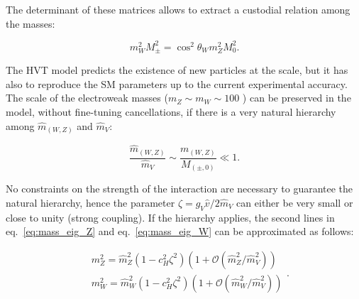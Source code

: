 \noindent The determinant of these matrices allows to extract a custodial relation among the masses:

\begin{equation}
m_W^2 M_{\pm}^2 = \cos^2{{\theta}_W} m_Z^2 M_0^2.
\label{eq:custodial_relation}
\end{equation}
%

\noindent The HVT model predicts the existence of new particles at the \TeV scale, but it has also to reproduce the SM parameters up to the current experimental accuracy. The scale of the electroweak masses ($m_Z \sim m_W \sim 100$ \GeV) can be preserved in the model, without fine-tuning cancellations, if there is a very natural hierarchy among $\hat{m}_{(W,Z)}$ and $\hat{m}_V$:

\begin{equation}
\frac{\hat{m}_{(W,Z)}}{\hat{m}_V} \sim \frac{{m}_{(W,Z)}}{M_{(\pm, 0)}} \ll 1.
\label{eq:mass_hierarchy}
\end{equation}

%
\noindent No constraints on the strength of the interaction are necessary to guarantee the natural hierarchy, hence the parameter $\zeta = g_V \hat{v} / 2 \hat{m}_V$ can either be very small or close to unity (strong coupling). If the hierarchy applies, the second lines in eq.~\ref{eq:mass_eig_Z} and eq.~\ref{eq:mass_eig_W} can be approximated as follows:

\begin{equation}
\begin{split}
& m_Z^2 = \hat{m}_Z^2 \left( 1 - c_H^2 {\zeta}^2\right) \left( 1 + \mathcal{O}(\hat{m}_Z^2/\hat{m}_V^2) \right) \\
& m_W^2 = \hat{m}_W^2 \left( 1 - c_H^2 {\zeta}^2\right) \left( 1 + \mathcal{O}(\hat{m}_W^2/\hat{m}_V^2) \right) \\
\end{split}
.
\label{eq:mass_simpl}
\end{equation}

